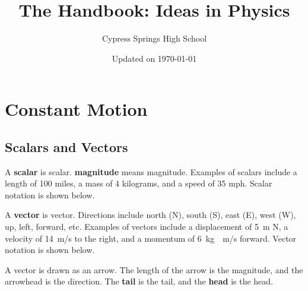 \documentclass[dvipsnames]{article}
\title{The Handbook: Ideas in Physics}
\author{Cypress Springs High School}
\date{Updated on \today}
\newif\ifShowUnitI                               %
\begin{document}
\maketitle
\tableofcontents

\clearpage
\section{Constant Motion}

\ifShowUnitI

\subsection{Scalars and Vectors}


A \textbf{\gls{scalar}} is \glsdesc{scalar}. \textbf{\Gls{magnitude}} means \glsdesc{magnitude}. Examples of scalars include a length of 100 miles, a mass of 4 kilograms, and a speed of 35 mph. Scalar notation is shown below.

\begin{center}
\end{center}

A \textbf{\gls{vector}} is \glsdesc{vector}. Directions include north (N), south (S), east (E), west (W), up, left, forward, etc. Examples of vectors include a displacement of \SI{5}{m} N, a velocity of \SI{14}{m/s} to the right, and a momentum of \SI{6}{kg\cdot m/s} forward. Vector notation is shown below.

\begin{center}
\end{center}


A vector is drawn as an arrow. The length of the arrow is the magnitude, and the arrowhead is the direction. The \textbf{\gls{tail}} is the \glsdesc{tail}, and the \textbf{\gls{head}} is the \glsdesc{head}.
\end{document}
